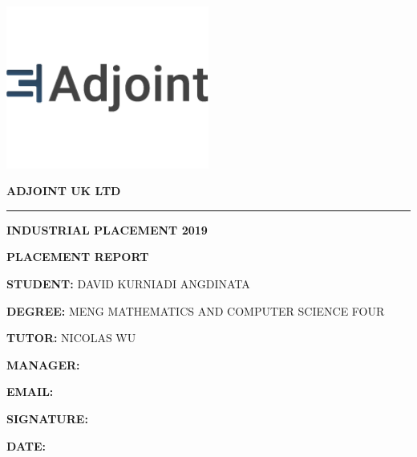 \documentclass[11pt]{article}
\begin{document}
\begin{center}

\includegraphics[width=0.5\textwidth]{adjoint.png}

\textbf{\LARGE ADJOINT UK LTD}

\vspace{0.5cm}

\hrule

\vspace{1.5cm}

\textbf{\Large INDUSTRIAL PLACEMENT 2019}

\vspace{0.5cm}

\textbf{\Large PLACEMENT REPORT}

\vspace{1.5cm}

{\large \textbf{STUDENT:} DAVID KURNIADI ANGDINATA}

\vspace{0.5cm}

{\large \textbf{DEGREE:} MENG MATHEMATICS AND COMPUTER SCIENCE FOUR}

\vspace{0.5cm}

{\large \textbf{TUTOR:} NICOLAS WU}

\vspace{1.5cm}

{\small \textbf{MANAGER:} \hspace{3cm}}

\vspace{0.5cm}

{\small \textbf{EMAIL:} \hspace{3cm}}

\vspace{0.5cm}

{\small \textbf{SIGNATURE:} \hspace{3cm}}

\vspace{0.5cm}

{\small \textbf{DATE:} \hspace{3cm}}

\end{center}
\end{document}
